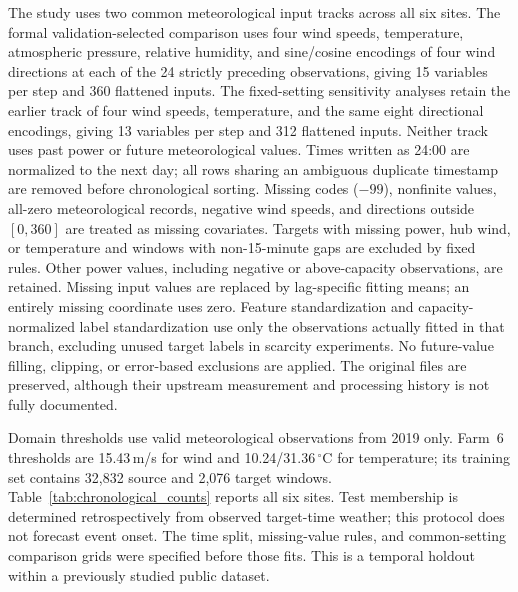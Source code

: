 {\color{blue}The study uses two common meteorological input tracks across all six sites. The formal validation-selected comparison uses four wind speeds, temperature, atmospheric pressure, relative humidity, and sine/cosine encodings of four wind directions at each of the 24 strictly preceding observations, giving 15 variables per step and 360 flattened inputs. The fixed-setting sensitivity analyses retain the earlier track of four wind speeds, temperature, and the same eight directional encodings, giving 13 variables per step and 312 flattened inputs. Neither track uses past power or future meteorological values. Times written as 24:00 are normalized to the next day; all rows sharing an ambiguous duplicate timestamp are removed before chronological sorting. Missing codes ($-99$), nonfinite values, all-zero meteorological records, negative wind speeds, and directions outside $[0,360]$ are treated as missing covariates. Targets with missing power, hub wind, or temperature and windows with non-15-minute gaps are excluded by fixed rules. Other power values, including negative or above-capacity observations, are retained. Missing input values are replaced by lag-specific fitting means; an entirely missing coordinate uses zero. Feature standardization and capacity-normalized label standardization use only the observations actually fitted in that branch, excluding unused target labels in scarcity experiments. No future-value filling, clipping, or error-based exclusions are applied. The original files are preserved, although their upstream measurement and processing history is not fully documented.}

{\color{blue}Domain thresholds use valid meteorological observations from 2019 only. Farm~6 thresholds are 15.43\,m/s for wind and 10.24/31.36\,$^\circ$C for temperature; its training set contains 32,832 source and 2,076 target windows. Table~\ref{tab:chronological_counts} reports all six sites. Test membership is determined retrospectively from observed target-time weather; this protocol does not forecast event onset. The time split, missing-value rules, and common-setting comparison grids were specified before those fits. This is a temporal holdout within a previously studied public dataset.}

